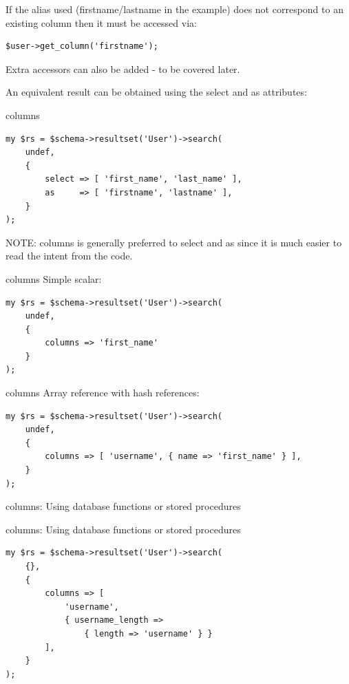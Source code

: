 If the alias used (firstname/lastname in the example) does not correspond to
an existing column then it must be accessed via:

\begin{lstlisting}
$user->get_column('firstname');
\end{lstlisting}

Extra accessors can also be added - to be covered later.

An equivalent result can be obtained using the select and as attributes:

\begin{frame}[fragile]{columns}
\begin{lstlisting}
my $rs = $schema->resultset('User')->search(
    undef,
    {
        select => [ 'first_name', 'last_name' ],
        as     => [ 'firstname', 'lastname' ],
    }
);
\end{lstlisting}
\end{frame}

NOTE: columns is generally preferred to select and as since it is much
easier to read the intent from the code.

\begin{frame}[fragile]{columns}
Simple scalar:

\begin{lstlisting}
my $rs = $schema->resultset('User')->search(
    undef,
    {
        columns => 'first_name'
    }
);
\end{lstlisting}

\end{frame}

\begin{frame}[fragile]{columns}
Array reference with hash references:

\begin{lstlisting}
my $rs = $schema->resultset('User')->search(
    undef,
    {
        columns => [ 'username', { name => 'first_name' } ],
    }
);
\end{lstlisting}
\end{frame}

columns: Using database functions or stored procedures

\begin{frame}[fragile]{columns: Using database functions or stored
    procedures}
\begin{lstlisting}
my $rs = $schema->resultset('User')->search(
    {},
    {
        columns => [
            'username',
            { username_length => 
                { length => 'username' } }
        ],
    }
);
\end{lstlisting}
\end{frame}

